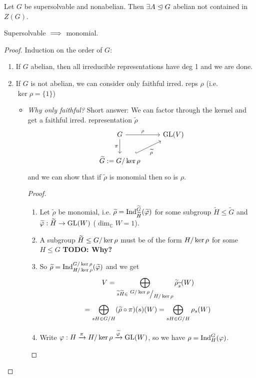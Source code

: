 \documentclass[a4paper]{article}
\begin{document}
\begin{lemm}[Lemma 4]
Let $G$ be supersolvable and nonabelian. Then $\exists A \trianglelefteq G$ abelian not contained in $Z(G)$.
\end{lemm}

\begin{thm}[Theorem 16]
  Supersolvable $\implies$ monomial.
  \begin{proof}
    Induction on the order of $G$:
    \begin{enumerate}
      \item If $G$ abelian, then all irreducible representations have deg 1 and we are done.
      \item If $G$ is not abelian, we can consider only faithful irred. reps $\rho$ (i.e. $\ker \rho = \{1\}$)
            \begin{itemize}
              \item \emph{Why only faithful?} Short answer: We can factor through the kernel and get a faithful irred. representation $\tilde \rho$
                    \[\begin{tikzcd}
G \arrow[r, "\rho"] \arrow[d, "\pi"']               & \GL(V) \\
\tilde G:= \fak{G}{\ker \rho} \arrow[ru, "\tilde \rho"', hook] &
\end{tikzcd}\]and we can show that if $\tilde \rho$ is monomial then so is $\rho$.
                    \begin{proof}
                      \begin{enumerate}[(1)]
                        \item Let $\tilde \rho$ be monomial, i.e. $\widetilde \rho = \operatorname{Ind}_{\widetilde H}^{\widetilde G}(\widetilde {\varphi})$ for some subgroup $\tilde H \le \tilde G$ and $\widetilde {\varphi}: \widetilde H \to \operatorname{GL}(W)$ ($\dim_{\mathbb C} W=1$).
                        \item A subgroup $\tilde H \le \fak G{\ker \rho}$ must be of the form $\fak H{\ker \rho}$ for some $H \le G$ \textbf{TODO: Why?}
                        \item So $\widetilde \rho = \operatorname{Ind}_{H/\ker \rho}^{G/\ker \rho}(\widetilde {\varphi})$ and we get
                              \[V = \bigoplus_{\tilde s \tilde H \in \scriptsize \displaystyle\fak{G/\ker \rho}{H/\ker \rho}}\tilde \rho_{\tilde s}(W) \]
                              \[= \bigoplus_{sH \in G/H} (\widetilde \rho \circ \pi)(s)(W) = \bigoplus_{sH \in G/H} \rho_{s}(W)\]
                        \item Write $\ph: H \tto \pi \fak H{\ker \rho} \tto {\tilde \ph}\GL(W)$, so we have $\rho = \operatorname{Ind}_{H}^{G}(\varphi)$.
                      \end{enumerate}


\end{proof}
\end{itemize}
\end{enumerate}
\end{proof}
\end{thm}
\end{document}
